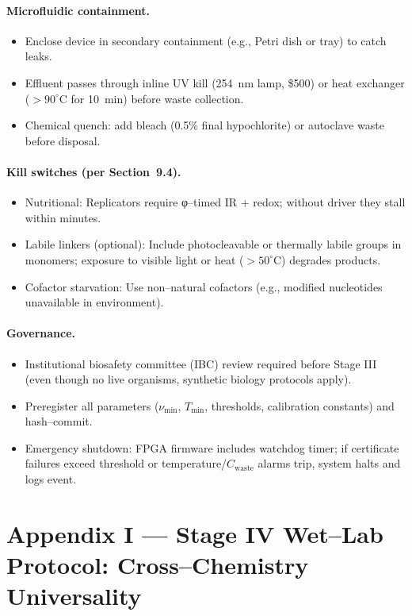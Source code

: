 \documentclass[11pt]{article}
\begin{document}
\paragraph{Microfluidic containment.}
\begin{itemize}
\item Enclose device in secondary containment (e.g., Petri dish or tray) to catch leaks.
\item Effluent passes through inline UV kill (254~nm lamp, \$500) or heat exchanger ($>90^\circ$C for 10~min) before waste collection.
\item Chemical quench: add bleach (0.5\% final hypochlorite) or autoclave waste before disposal.
\end{itemize}

\paragraph{Kill switches (per Section~9.4).}
\begin{itemize}
\item Nutritional: Replicators require φ–timed IR + redox; without driver they stall within minutes.
\item Labile linkers (optional): Include photocleavable or thermally labile groups in monomers; exposure to visible light or heat ($>50^\circ$C) degrades products.
\item Cofactor starvation: Use non–natural cofactors (e.g., modified nucleotides unavailable in environment).
\end{itemize}

\paragraph{Governance.}
\begin{itemize}
\item Institutional biosafety committee (IBC) review required before Stage III (even though no live organisms, synthetic biology protocols apply).
\item Preregister all parameters ($\nu_{\min}$, $T_{\min}$, thresholds, calibration constants) and hash–commit.
\item Emergency shutdown: FPGA firmware includes watchdog timer; if certificate failures exceed threshold or temperature/$C_{\mathrm{waste}}$ alarms trip, system halts and logs event.
\end{itemize}


\section*{Appendix I — Stage IV Wet–Lab Protocol: Cross–Chemistry Universality}\label{app:stage4-protocol}
\end{document}
